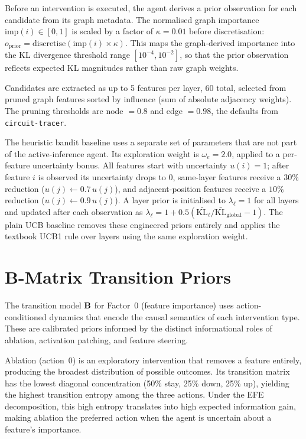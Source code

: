 Before an intervention is executed, the agent derives a prior
observation for each candidate from its graph metadata. The normalised
graph importance $\text{imp}(i) \in [0,1]$ is scaled by a factor of
$\kappa = 0.01$ before discretisation: $o_{\text{prior}} =
\text{discretise}(\text{imp}(i) \times \kappa)$. This maps the
graph-derived importance into the KL divergence threshold range
$[10^{-4}, 10^{-2}]$, so that the prior observation reflects expected
KL magnitudes rather than raw graph weights.

Candidates are extracted as up to 5 features per layer, 60 total,
selected from pruned graph features sorted by influence (sum of absolute
adjacency weights). The pruning thresholds are node $=0.8$ and edge
$=0.98$, the defaults from \texttt{circuit-tracer}.

The heuristic bandit baseline uses a separate set of parameters that are
not part of the active-inference agent. Its exploration weight is
$\omega_e = 2.0$, applied to a per-feature uncertainty bonus. All
features start with uncertainty $u(i) = 1$; after feature $i$ is
observed its uncertainty drops to $0$, same-layer features receive a
$30\%$ reduction ($u(j) \leftarrow 0.7\,u(j)$), and adjacent-position
features receive a $10\%$ reduction ($u(j) \leftarrow 0.9\,u(j)$). A
layer prior is initialised to $\lambda_\ell = 1$ for all layers and
updated after each observation as $\lambda_\ell = 1 + 0.5
(\bar{\text{KL}}_\ell / \bar{\text{KL}}_{\text{global}} - 1)$. The plain
UCB baseline removes these engineered priors entirely and applies the
textbook UCB1 rule over layers using the same exploration weight.


\section{B-Matrix Transition Priors}
\label{app:bmatrix}

The transition model $\mathbf{B}$ for Factor~0 (feature importance) uses
action-conditioned dynamics that encode the causal semantics of each
intervention type.  These are calibrated priors informed by the
distinct informational roles of ablation, activation patching, and
feature steering.

Ablation (action~0) is an exploratory intervention that
removes a feature entirely, producing the broadest distribution of
possible outcomes.  Its transition matrix has the lowest diagonal
concentration (50\% stay, 25\% down, 25\% up), yielding the highest
transition entropy among the three actions.  Under the EFE
decomposition, this high entropy translates into high expected
information gain, making ablation the preferred action when the
agent is uncertain about a feature's importance.

